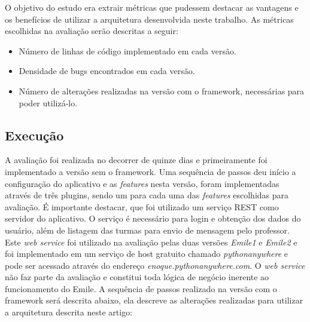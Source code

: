 O objetivo do estudo era extrair métricas que pudessem destacar as vantagens e os benefícios de utilizar a arquitetura desenvolvida neste trabalho. As métricas escolhidas na avaliação serão descritas a seguir:

\begin{itemize}
	\item Número de linhas de código implementado em cada versão.

	\item Densidade de bugs encontrados em cada versão.

	\item Número de alterações realizadas na versão com o framework, necessárias para poder utilizá-lo.
\end{itemize}


\subsection{Execução}
A avaliação foi realizada no decorrer de quinze dias e primeiramente foi implementado a versão sem o framework. Uma sequência de passos deu início a configuração do aplicativo e as \textit{features} nesta versão, foram implementadas através de três plugins, sendo um para cada uma das \textit{features} escolhidas para avaliação. É importante destacar, que foi utilizado um serviço REST  como servidor do aplicativo. O serviço é necessário para login e obtenção dos dados do usuário, além de listagem das turmas para envio de mensagem pelo professor. Este \textit{web service} foi utilizado na avaliação pelas duas versões \textit{Emile1} e \textit{Emile2} e foi implementado em um serviço de host gratuito chamado \textit{pythonanywhere} e pode ser acessado através do endereço \textit{enoque.pythonanywhere.com}. O \textit{web service} não faz parte da avaliação e constitui toda lógica de negócio inerente ao funcionamento do Emile. A sequência de passos realizado na versão com o framework será descrita abaixo, ela descreve as alterações realizadas para utilizar a arquitetura descrita neste artigo:

